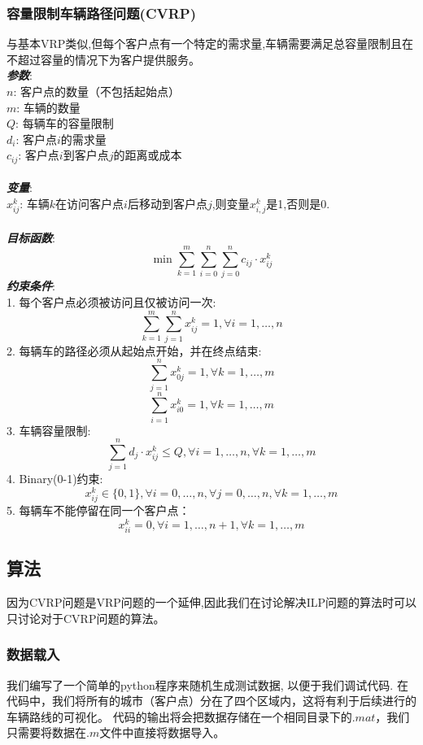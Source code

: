 \subsubsection{容量限制车辆路径问题(CVRP)}
与基本VRP类似,但每个客户点有一个特定的需求量,车辆需要满足总容量限制且在不超过容量的情况下为客户提供服务。
    \\
    \textbf{\textit{参数}}:\\
    $n$: 客户点的数量（不包括起始点）\\
    $m$: 车辆的数量\\
    $Q$: 每辆车的容量限制\\
    $d_i$: 客户点$i$的需求量\\
    $c_{ij}$: 客户点$i$到客户点$j$的距离或成本\\
    \\
    \textbf{\textit{变量}}:\\
    $x_{ij}^{k}$: 车辆$k$在访问客户点$i$后移动到客户点$j$,则变量$x_{i,j}^k$是1,否则是0.\\
    \\
    \textbf{\textit{目标函数}}:
    \[\min\sum_{k=1}^{m}\sum_{i=0}^{n}\sum_{j=0}^{n}c_{ij}\cdot x_{ij}^{k}\]
    \textbf{\textit{约束条件}}:\\
    1. 每个客户点必须被访问且仅被访问一次:
    \[\sum_{k=1}^{m}\sum_{j=1}^{n}x_{ij}^{k} = 1, \forall i = 1, \dots, n\]
    2. 每辆车的路径必须从起始点开始，并在终点结束:
    \[\sum_{j = 1}^{n}x_{0j}^{k} = 1, \forall k = 1, \dots, m\]
    \[\sum_{i = 1}^{n}x_{i0}^{k} = 1, \forall k = 1, \dots, m\]
    3. 车辆容量限制:
    \[\sum_{j = 1}^{n}d_{j}\cdot x_{ij}^{k} \leq Q, \forall i = 1, \dots, n, \forall k = 1, \dots, m\]
    4. Binary(0-1)约束:
    \[x_{ij}^{k}\in \{0, 1\}, \forall i = 0, \dots, n, \forall j = 0, \dots, n, \forall k = 1, \dots, m\]
    5. 每辆车不能停留在同一个客户点：
    \[x_{ii}^k = 0, \forall i = 1, \dots, n+1, \forall k = 1, \dots, m\]

\subsection{算法}
    因为CVRP问题是VRP问题的一个延伸,因此我们在讨论解决ILP问题的算法时可以只讨论对于CVRP问题的算法。
\subsubsection{数据载入}
    我们编写了一个简单的python程序来随机生成测试数据, 以便于我们调试代码. 在代码中，我们将所有的城市（客户点）分在了四个区域内，这将有利于后续进行的车辆路线的可视化。
    代码的输出将会把数据存储在一个相同目录下的$.mat$，我们只需要将数据在$.m$文件中直接将数据导入。
